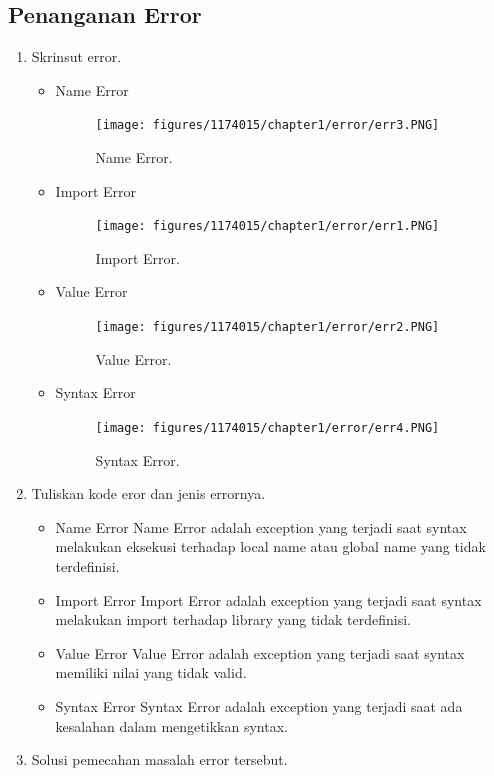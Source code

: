 \subsection{Penanganan Error}
\begin{enumerate}
	\item Skrinsut error.
	\begin{itemize}
		\item Name Error
		\hfill\break
		\begin{figure}[H]
			\texttt{[image: figures/1174015/chapter1/error/err3.PNG]}
			\centering
			\caption{Name Error.}
		\end{figure}
		\item Import Error
		\hfill\break
		\begin{figure}[H]
			\texttt{[image: figures/1174015/chapter1/error/err1.PNG]}
			\centering
			\caption{Import Error.}
		\end{figure}
		\item Value Error
		\hfill\break
		\begin{figure}[H]
			\texttt{[image: figures/1174015/chapter1/error/err2.PNG]}
			\centering
			\caption{Value Error.}
		\end{figure}
		\item Syntax Error
		\hfill\break
		\begin{figure}[H]
			\texttt{[image: figures/1174015/chapter1/error/err4.PNG]}
			\centering
			\caption{Syntax Error.}
		\end{figure}
	\end{itemize}
	\item Tuliskan kode eror dan jenis errornya.
	\begin{itemize}
		\item Name Error
		\hfill\break
		Name Error adalah exception yang terjadi saat syntax melakukan eksekusi terhadap local name atau global name yang tidak terdefinisi.
		\item Import Error
		\hfill\break
		Import Error adalah exception yang terjadi saat syntax melakukan import terhadap library yang tidak terdefinisi.
		\item Value Error
		\hfill\break
		Value Error adalah exception yang terjadi saat syntax memiliki nilai yang tidak valid.
		\item Syntax Error
		\hfill\break
		Syntax Error adalah exception yang terjadi saat ada kesalahan dalam mengetikkan syntax.
	\end{itemize}
	\item Solusi pemecahan masalah error tersebut.

\end{enumerate}

